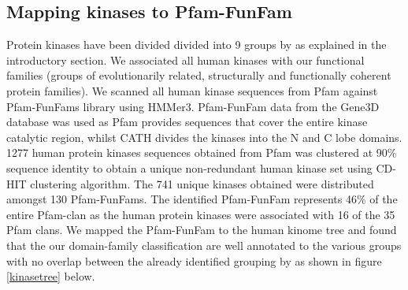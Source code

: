 \documentclass[a4paper, 11pt]{article}
\begin{document}
\subsection*{Mapping kinases to Pfam-FunFam}
Protein kinases have been divided divided into 9 groups by \cite{manning2002protein} as explained in the introductory section. We associated all human kinases with our functional families (groups of evolutionarily related, structurally and functionally coherent protein families). We scanned all human kinase sequences from Pfam against Pfam-FunFams library using HMMer3. Pfam-FunFam data from the Gene3D database was used as Pfam provides sequences that cover the entire kinase catalytic region, whilst CATH divides the kinases into the N and C lobe domains.\\
1277 human protein kinases sequences obtained from Pfam was clustered at 90\% sequence identity to obtain a unique non-redundant human kinase set using CD-HIT clustering algorithm. The 741 unique kinases obtained were distributed amongst 130 Pfam-FunFams. The identified Pfam-FunFam represents 46\% of the entire Pfam-clan as the human protein kinases were associated with 16 of the 35 Pfam clans. We mapped the Pfam-FunFam to the human kinome tree and found that the our domain-family classification are well annotated to the various groups with no overlap between the already identified grouping by \cite{manning2002protein} as shown in figure \ref{kinasetree} below.
\end{document}
